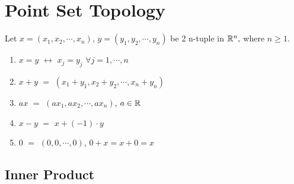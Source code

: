 \documentclass {article}
\begin{document}
\section {Point Set Topology}
	Let $x=(x_1, x_2, \cdots , x_n)$, $y=(y_1, y_2, \cdots , y_n)$ be 2 n-tuple in $\Bbb R^n,$ where $n\geq1$.
	\begin {enumerate}
		\item {$x=y$ $\leftrightarrow$ $x_j=y_j$ $\forall j=1,\cdots,n$}
		\item {$x+y$ $=$ $(x_1+y_1, x_2+y_2,\cdots,x_n+y_n)$}
		\item {$ax$ $=$ $(ax_1, ax_2,\cdots,ax_n)$, $a\in \Bbb R$}
		\item {$x-y$ $=$ $x+(-1)\cdot y$}
		\item {$0$ $=$ $(0,0,\cdots,0)$, $0+x=x+0=x$}
	\end {enumerate}
	
	\subsection {Inner Product}
\end{document}

